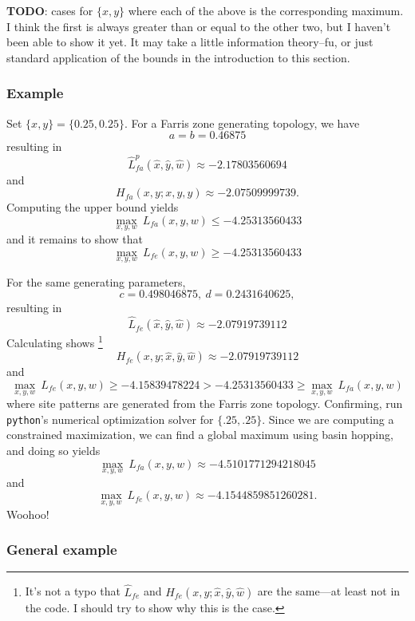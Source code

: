\documentclass[a4paper]{article}
\begin{document}
\textbf{TODO}: cases for $\{x, y\}$ where each of the above is the corresponding maximum.
I think the first is always greater than or equal to the other two, but I haven't been able to show it yet.
It may take a little information theory--fu, or just standard application of the bounds in the introduction to this section.

\subsubsection{Example}

Set $\{x, y\} = \{0.25, 0.25\}$.
For a Farris zone generating topology, we have
$$
a = b = 0.46875
$$
resulting in
$$
\hat{L}_{fa}^{p}(\hat{x}, \hat{y}, \hat{w}) \approx -2.17803560694
$$
and
$$
H_{fa}(x,y;x,y,y) \approx -2.07509999739.
$$
Computing the upper bound yields
$$
\max_{x,y,w} \ L_{fa}(x,y,w) \le -4.25313560433
$$
and it remains to show that 
$$
\max_{x,y,w} \ L_{fe}(x,y,w) \ge -4.25313560433
$$

For the same generating parameters,
$$
c = 0.498046875, \ d = 0.2431640625,
$$
resulting in
$$
\hat{L}_{fe}(\hat{x}, \hat{y}, \hat{w}) \approx -2.07919739112
$$
Calculating shows%
    \footnote{It's not a typo that $\hat{L}_{fe}$ and $H_{fe}(x,y; \hat{x}, \hat{y}, \hat{w})$ are the same---at least not in the code.
        I should try to show why this is the case.
        }
$$
H_{fe}(x,y; \hat{x}, \hat{y}, \hat{w}) \approx -2.07919739112
$$
and
$$
\max_{x,y,w} \ L_{fe}(x,y,w) \ge -4.15839478224 > -4.25313560433 \ge \max_{x,y,w} \ L_{fa}(x,y,w)
$$
where site patterns are generated from the Farris zone topology.
Confirming, run \texttt{python}'s numerical optimization solver for $\{.25, .25\}$.
Since we are computing a constrained maximization, we can find a global maximum using basin hopping, and doing so yields
$$
\max_{x,y,w} \ L_{fa}(x,y,w) \approx -4.5101771294218045
$$
and
$$
\max_{x,y,w} \ L_{fe}(x,y,w) \approx -4.1544859851260281.
$$
Woohoo!

\subsubsection{General example}
\end{document}
